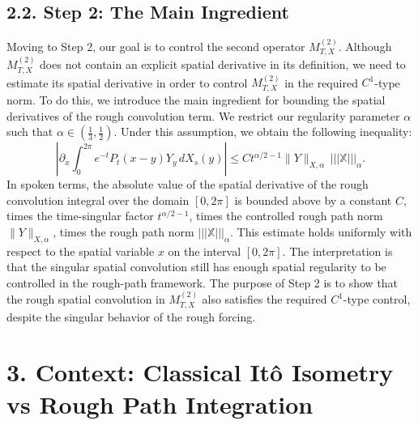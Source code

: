 \documentclass[11pt]{article}
\theoremstyle{definition}
\theoremstyle{remark}
\begin{document}
\subsection*{2.2. Step 2: The Main Ingredient}
Moving to Step 2, our goal is to control the second operator $M_{T,X}^{(2)}$. Although $M_{T,X}^{(2)}$ does not contain an explicit spatial derivative in its definition, we need to estimate its spatial derivative in order to control $M_{T,X}^{(2)}$ in the required $C^1$-type norm. To do this, we introduce the main ingredient for bounding the spatial derivatives of the rough convolution term. We restrict our regularity parameter $\alpha$ such that $\alpha\in(\frac13,\frac12)$. Under this assumption, we obtain the following inequality:
\begin{equation}\label{eq:step2-rough-estimate}
\left|\partial_x\int_0^{2\pi} e^{-t}P_t(x-y)Y_y\,dX_s(y)\right|
\le C t^{\alpha/2-1} \|Y\|_{X,\alpha}\, |||\mathbb X|||_{\alpha}.
\end{equation}
In spoken terms, the absolute value of the spatial derivative of the rough convolution integral over the domain $[0,2\pi]$ is bounded above by a constant $C$, times the time-singular factor $t^{\alpha/2-1}$, times the controlled rough path norm $\|Y\|_{X,\alpha}$, times the rough path norm $|||\mathbb X|||_{\alpha}$. This estimate holds uniformly with respect to the spatial variable $x$ on the interval $[0,2\pi]$.
The interpretation is that the singular spatial convolution still has enough spatial regularity to be controlled in the rough-path framework.
The purpose of Step 2 is to show that the rough spatial convolution in $M_{T,X}^{(2)}$ also satisfies the required $C^1$-type control, despite the singular behavior of the rough forcing.

\section*{3. Context: Classical It\^o Isometry vs Rough Path Integration}
\end{document}
